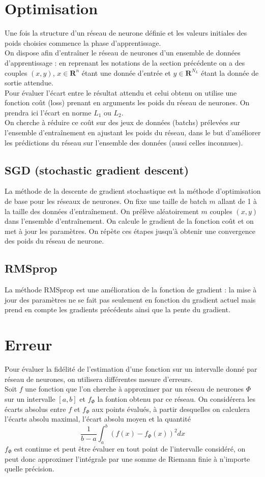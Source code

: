 \documentclass[a4paper,11pt,twoside]{report}
\begin{document}
	\section{Optimisation}
	Une fois la structure d'un réseau de neurone définie et les valeurs initiales des poids choisies commence la phase d'apprentissage.\\
	On dispose afin d'entraîner le réseau de neurones d'un ensemble de données d'apprentissage : en reprenant les notations de la section précédente on a des couples $(x,y)$, $x\in\mathbf{R}^n$ étant une donnée d'entrée et $y\in\mathbf{R}^{N_L}$ étant la donnée de sortie attendue.\\
	Pour évaluer l'écart entre le résultat attendu et celui obtenu on utilise une fonction coût (loss) prenant en arguments les poids du réseau de neurones. On prendra ici l'écart en norme $L_1$ ou $L_2$.\\ On cherche à réduire ce coût sur des jeux de données (batchs) prélevées sur l'ensemble d'entraînement en ajustant les poids du réseau, dans le but d'améliorer les prédictions du réseau sur l'ensemble des données (aussi celles inconnues).
	\subsection{SGD (stochastic gradient descent)}
	La méthode de la descente de gradient stochastique est la méthode d'optimisation de base pour les réseaux de neurones. On fixe une taille de batch $m$ allant de 1 à la taille des données d'entraînement. On prélève  aléatoirement $m$ couples $(x,y)$ dans l'ensemble d'entraînement. On calcule le gradient de la fonction coût et on met à jour les paramètres. On répète ces étapes jusqu'à obtenir une convergence des poids du réseau de neurone.
	\subsection{RMSprop}
	La méthode RMSprop est une amélioration de la fonction de gradient : la mise à jour des paramètres ne se fait pas seulement en fonction du gradient actuel mais prend en compte les gradients précédents ainsi que la pente du gradient.
	\section{Erreur}
	Pour évaluer la fidélité de l'estimation d'une fonction sur un intervalle donné par réseau de neurones, on utilisera différentes mesure d'erreurs.\\
	Soit $f$ une fonction que l'on cherche à approximer par un réseau de neurones $\Phi$ sur un intervalle $[a,b]$ et $f_\Phi$ la fontion obtenu par ce réseau.
	On considérera les écarts absolus entre $f$ et $f_\Phi$ aux points évalués, à partir desquelles on calculera l'écarts absolu maximal, l'écart absolu moyen et la quantité $$\frac{1}{b-a}\int_a^b (f(x)-f_\Phi(x))^2dx$$
	$f_\Phi$ est continue et peut être évaluer en tout point de l'intervalle considéré, on peut donc approximer l'intégrale par une somme de Riemann finie à n'importe quelle précision.
\end{document}
